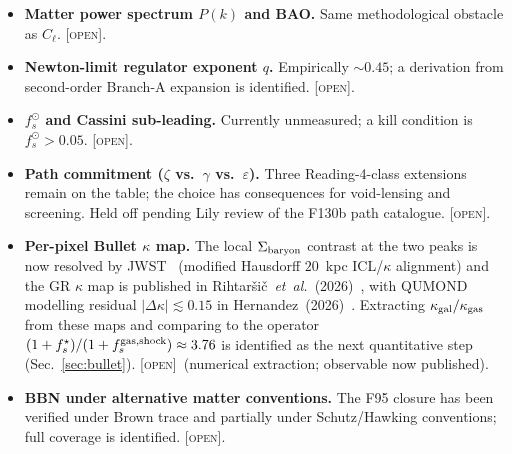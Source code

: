 \documentclass[aps,prd,twocolumn,nofootinbib,floatfix,superscriptaddress]{revtex4-2}
\newcommand{\OPEN}{{\color{black!60!red}\textsc{[open]}}}
\newcommand{\Lm}{\mathcal{L}_m}
\begin{document}
\begin{itemize}
(factor $\sim 8$ too large; reading is galactic-specific); per-step
transient $D_{\rm KL}$ summed gives $0.30$ (factor $\sim 19$ short;
Shore--Johnson additivity does not extend to time-separated events);
R\'enyi-2 sum at the 4-step partition gives $5.82$ accidentally but
Shore--Johnson forces $q=1$ (Sec.~\ref{sec:fprim}, F145). Closing
the chain therefore requires either (a) a path-integral extension
of the action (re-checks A05, F46 ratchet, $(1{+}f)\Lm$, the
Shore--Johnson uniqueness derivation), or (b) a demonstration that
the discrete sum emerges from a different limit of $(1{+}f)\Lm$
than the single-epoch $D_{\rm KL}$, or (c) a more abstract
information-theoretic measure for which the discrete sum is the
unique additive monotone functional. The $\sim 2$--$3\sigma$
two-$\alpha$ structural question ($\alpha_{\rm gal} = 0.869$ vs.\
$\alpha_{\rm cosmo} \approx 1.71$ for the smooth-integral form to
recover $5.66$) is identified as a propagated sub-problem. \OPEN.
\item \textbf{Matter power spectrum $P(k)$ and BAO.} Same
methodological obstacle as $C_\ell$. \OPEN.
\item \textbf{Newton-limit regulator exponent $q$.} Empirically
$\sim 0.45$; a derivation from second-order Branch-A expansion is
identified. \OPEN.
\item \textbf{$f_s^\odot$ and Cassini sub-leading.} Currently
unmeasured; a kill condition is $f_s^\odot > 0.05$.
\OPEN.
\item \textbf{Path commitment ($\zeta$ vs.\ $\gamma$ vs.\ $\varepsilon$).}
Three Reading-4-class extensions remain on the table; the choice
has consequences for void-lensing and screening. Held off pending
Lily review of the F130b path catalogue. \OPEN.
\item \textbf{Per-pixel Bullet $\kappa$ map.} The local
$\Sigma_{\rm baryon}$ contrast at the two peaks is now resolved by
JWST~\cite{Cha2025} (modified Hausdorff $20$~kpc ICL/$\kappa$
alignment) and the GR $\kappa$ map is published in
Rihtar\v{s}i\v{c}~\emph{et~al.}~(2026)~\cite{Rihtarsic2026}, with
QUMOND modelling residual $|\Delta\kappa|\lesssim 0.15$ in
Hernandez~(2026)~\cite{Hernandez2026}. Extracting
$\kappa_{\rm gal}/\kappa_{\rm gas}$ from these maps and comparing to
the operator $(1+f_s^\star)/(1+f_s^{\rm gas,shock}) \approx 3.76$
is identified as the next quantitative step
(Sec.~\ref{sec:bullet}). \OPEN\ (numerical extraction; observable now
published).
\item \textbf{BBN under alternative matter conventions.} The F95
closure has been verified under Brown trace and partially under
Schutz/Hawking conventions; full coverage is identified.
\OPEN.
\end{itemize}
\end{document}
